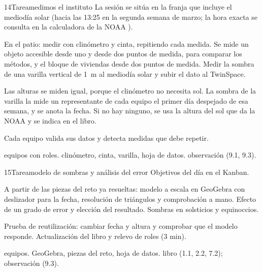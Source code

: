 \begin{sesionbox}{14}{Tarea}{medimos el instituto}
 La sesión se sitúa en la franja que incluye el mediodía solar (hacia las 13:25 en la segunda semana de marzo; la hora exacta se consulta en la calculadora de la NOAA \parencite{noaa}).

 En el patio: medir con clinómetro y cinta, repitiendo cada medida. Se mide un objeto accesible desde uno y desde dos puntos de medida, para comparar los métodos, y el bloque de viviendas desde dos puntos de medida. Medir la sombra de una varilla vertical de 1~m al mediodía solar y subir el dato al TwinSpace.

 Las alturas se miden igual, porque el clinómetro no necesita sol. La sombra de la varilla la mide un representante de cada equipo el primer día despejado de esa semana, y se anota la fecha. Si no hay ninguno, se usa la altura del sol que da la NOAA y se indica en el libro.

 Cada equipo valida sus datos y detecta medidas que debe repetir.

 equipos con roles.  clinómetro, cinta, varilla, hoja de datos.  observación (9.1, 9.3).
\end{sesionbox}

\begin{sesionbox}{15}{Tarea}{modelo de sombras y análisis del error}
 Objetivos del día en el Kanban.

 A partir de las piezas del reto ya resueltas: modelo a escala en GeoGebra con deslizador para la fecha, resolución de triángulos y comprobación a mano. Efecto de un grado de error y elección del resultado. Sombras en solsticios y equinoccios.

 Prueba de reutilización: cambiar fecha y altura y comprobar que el modelo responde. Actualización del libro y relevo de roles (3 min).

 equipos.  GeoGebra, piezas del reto, hoja de datos.  libro (1.1, 2.2, 7.2); observación (9.3).
\end{sesionbox}

